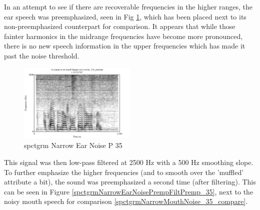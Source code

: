 \documentclass[dissertation,copyright]{uathesis}
\begin{document}
In an attempt to see if there are recoverable frequencies in the higher ranges, the ear speech was preemphasized, seen in Fig \ref{spctgrmNarrowEarNoisePremp_35}, which has been placed next to its non-preemphasized counterpart for comparison.  It appears that while those fainter harmonics in the midrange frequencies have become more pronounced, there is no new speech information in the upper frequencies which has made it past the noise threshold.

\begin{figure}
\includegraphics[width=0.5\textwidth]{figure/spctgrmNarrowEarNoisePremp.pdf}
\caption{spctgrm Narrow Ear Noise P 35}
\label{spctgrmNarrowEarNoisePremp_35}
\end{figure}

This signal was then low-pass filtered at 2500 Hz with a 500 Hz smoothing slope. To further emphasize the higher frequencies (and to smooth over the 'muffled' attribute a bit), the sound was preemphasized a second time (after filtering).  This can be seen in Figure \ref{spctgrmNarrowEarNoisePrempFiltPremp_35}, next to the noisy mouth speech for comparison \ref{spctgrmNarrowMouthNoise_35_compare}.
\end{document}
